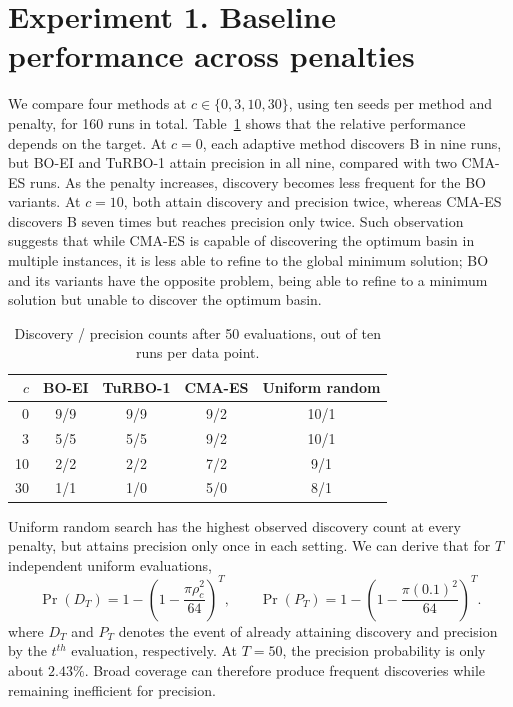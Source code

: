 \section{Experiment 1. Baseline performance across penalties}
\label{sec:exp1}
We compare four methods at \(c\in\{0,3,10,30\}\), using ten seeds per method and penalty, for 160 runs in total. Table~\ref{tab:exp1} shows that the relative performance depends on the target. At \(c=0\), each adaptive method discovers B in nine runs, but BO-EI and TuRBO-1 attain precision in all nine, compared with two CMA-ES runs. As the penalty increases, discovery becomes less frequent for the BO variants. At \(c=10\), both attain discovery and precision twice, whereas CMA-ES discovers B seven times but reaches precision only twice. Such observation suggests that while CMA-ES is capable of discovering the optimum basin in multiple instances, it is less able to refine to the global minimum solution; BO and its variants have the opposite problem, being able to refine to a minimum solution but unable to discover the optimum basin.

\begin{table}[!htb]
 \centering
 \caption{Discovery / precision counts after 50 evaluations, out of ten runs per data point.}
 \label{tab:exp1}
 \begin{tabular}{rcccc}
 \toprule
 \(c\) & BO-EI & TuRBO-1 & CMA-ES & Uniform random\\
 \midrule
 0  & 9/9 & 9/9 & 9/2 & 10/1\\
 3  & 5/5 & 5/5 & 9/2 & 10/1\\
 10 & 2/2 & 2/2 & 7/2 & 9/1\\
 30 & 1/1 & 1/0 & 5/0 & 8/1\\
 \bottomrule
 \end{tabular}
\end{table}

Uniform random search has the highest observed discovery count at every penalty, but attains precision only once in each setting. We can derive that for \(T\) independent uniform evaluations,
\begin{equation}
\label{eq:uniform}
 \Pr(D_T)=
 1-\left(1-\frac{\pi\rho_c^2}{64}\right)^T,
 \qquad
 \Pr(P_T)=
 1-\left(1-\frac{\pi(0.1)^2}{64}\right)^T.
\end{equation}
where $D_T$ and $P_T$ denotes the event of already attaining discovery and precision by the $t^{th}$ evaluation, respectively. At \(T=50\), the precision probability is only about \(2.43\%\). Broad coverage can therefore produce frequent discoveries while remaining inefficient for precision. 

